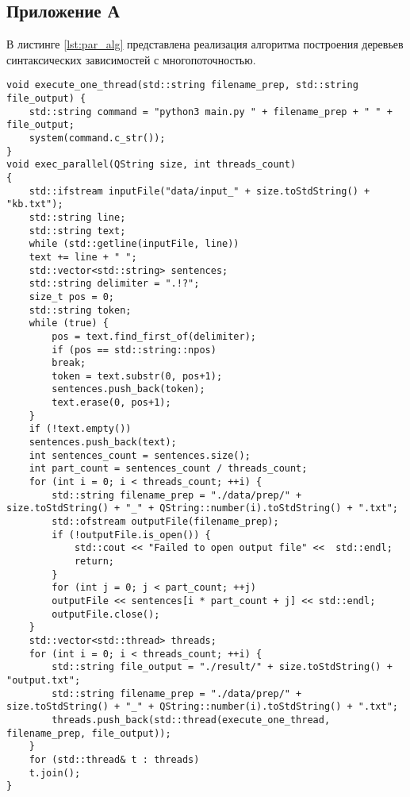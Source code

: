 \begin{appendix}
\chapter*{Приложение А}
	
В листинге \ref{lst:par_alg} представлена реализация алгоритма построения деревьев синтаксических зависимостей с многопоточностью.

\begin{center}
	\captionsetup{justification=raggedright,singlelinecheck=off}
	\begin{lstlisting}[label=lst:par_alg,caption=Алгоритм построения деревьев синтаксических зависимостей с многопоточностью]
void execute_one_thread(std::string filename_prep, std::string file_output) {
	std::string command = "python3 main.py " + filename_prep + " " + file_output;
	system(command.c_str());
}
void exec_parallel(QString size, int threads_count)
{
	std::ifstream inputFile("data/input_" + size.toStdString() + "kb.txt");
	std::string line;
	std::string text;
	while (std::getline(inputFile, line)) 
	text += line + " ";
	std::vector<std::string> sentences;
	std::string delimiter = ".!?";
	size_t pos = 0;
	std::string token;
	while (true) {
		pos = text.find_first_of(delimiter);
		if (pos == std::string::npos) 
		break;
		token = text.substr(0, pos+1);
		sentences.push_back(token);
		text.erase(0, pos+1);
	}
	if (!text.empty()) 
	sentences.push_back(text);
	int sentences_count = sentences.size();
	int part_count = sentences_count / threads_count;
	for (int i = 0; i < threads_count; ++i) {
		std::string filename_prep = "./data/prep/" + size.toStdString() + "_" + QString::number(i).toStdString() + ".txt";
		std::ofstream outputFile(filename_prep);
		if (!outputFile.is_open()) {
			std::cout << "Failed to open output file" <<  std::endl;
			return;
		}
		for (int j = 0; j < part_count; ++j)
		outputFile << sentences[i * part_count + j] << std::endl;
		outputFile.close();
	}
	std::vector<std::thread> threads;
	for (int i = 0; i < threads_count; ++i) {
		std::string file_output = "./result/" + size.toStdString() + "output.txt";
		std::string filename_prep = "./data/prep/" + size.toStdString() + "_" + QString::number(i).toStdString() + ".txt";
		threads.push_back(std::thread(execute_one_thread, filename_prep, file_output));
	}
	for (std::thread& t : threads)
	t.join();
}
	\end{lstlisting}
\end{center}
\end{appendix}